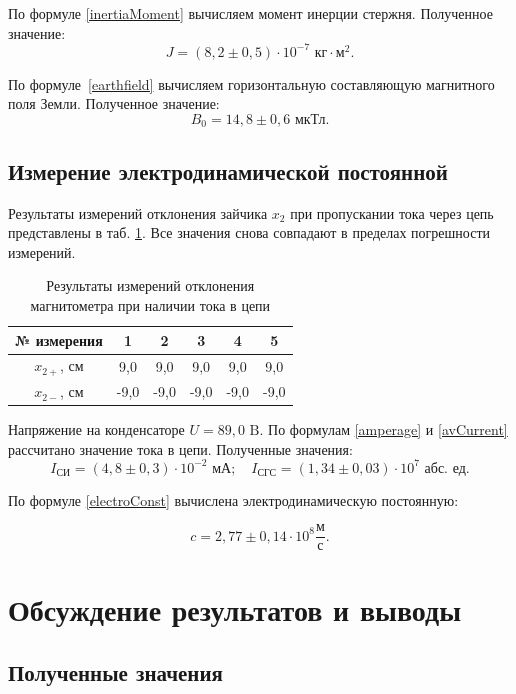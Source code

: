 \documentclass[a4paper,12pt]{article} %
\begin{document}
По формуле \eqref{inertiaMoment} вычисляем момент инерции стержня. Полученное значение: $$J = (8,2\pm0,5) \cdot 10^{-7} \text{ кг}\cdot\text{м}^2.$$

По формуле~\eqref{earthfield} вычисляем горизонтальную составляющую магнитного поля Земли. Полученное значение: $$B_0 = 14,8\pm0,6\text{ мкТл}.$$

\subsection{Измерение электродинамической постоянной}

Результаты измерений отклонения зайчика $x_2$ при пропускании тока через цепь представлены в таб. \ref{tab:res2}. Все значения снова совпадают в пределах погрешности измерений.

\begin{table}[h!]
\begin{center}
\begin{tabular}{|c|c|c|c|c|c|}
\hline
    № измерения & 1 & 2 & 3 & 4 & 5 \\ \hline
    $x_{2+}$, см & 9,0 & 9,0 & 9,0 & 9,0 & 9,0 \\ \hline
    $x_{2-}$, см & -9,0 & -9,0 & -9,0 & -9,0 & -9,0 \\ \hline
\end{tabular}
\end{center}
\caption{Результаты измерений отклонения магнитометра при наличии тока в цепи}
\label{tab:res2}
\end{table}

Напряжение на конденсаторе $U = 89,0\text{ B}$. По формулам \eqref{amperage} и \eqref{avCurrent} рассчитано значение тока в цепи. Полученные значения: $$I_\text{СИ} = (4,8\pm0,3)\cdot 10^{-2}\text{ мА}; \quad I_\text{СГС} = (1,34\pm0,03)\cdot10^7\text{ абс. ед.}$$

По формуле \eqref{electroConst} вычислена электродинамическую постоянную:

$$c = 2,77\pm0,14\cdot10^8 \frac{\text{м}}{\text{с}}.$$

\section{Обсуждение результатов и выводы}

\subsection*{Полученные значения}
\end{document}
